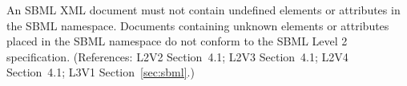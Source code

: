 An SBML XML document must not contain undefined elements or
attributes in the SBML namespace.  Documents containing unknown
elements or attributes placed in the SBML namespace do not conform
to the SBML Level 2 specification.  (References: L2V2 Section~4.1;
L2V3 Section~4.1; L2V4 Section~4.1; L3V1 Section~\ref{sec:sbml}.)
